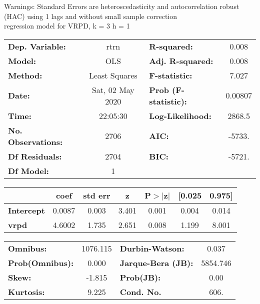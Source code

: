 Warnings: \newline
 [1] Standard Errors are heteroscedasticity and autocorrelation robust (HAC) using 1 lags and without small sample correction\\ 

regression model for VRPD, k = 3 h = 1\begin{center}
\begin{tabular}{lclc}
\toprule
\textbf{Dep. Variable:}    &       rtrn       & \textbf{  R-squared:         } &     0.008   \\
\textbf{Model:}            &       OLS        & \textbf{  Adj. R-squared:    } &     0.008   \\
\textbf{Method:}           &  Least Squares   & \textbf{  F-statistic:       } &     7.027   \\
\textbf{Date:}             & Sat, 02 May 2020 & \textbf{  Prob (F-statistic):} &  0.00807    \\
\textbf{Time:}             &     22:05:30     & \textbf{  Log-Likelihood:    } &    2868.5   \\
\textbf{No. Observations:} &        2706      & \textbf{  AIC:               } &    -5733.   \\
\textbf{Df Residuals:}     &        2704      & \textbf{  BIC:               } &    -5721.   \\
\textbf{Df Model:}         &           1      & \textbf{                     } &             \\
\bottomrule
\end{tabular}
\begin{tabular}{lcccccc}
                   & \textbf{coef} & \textbf{std err} & \textbf{z} & \textbf{P$> |$z$|$} & \textbf{[0.025} & \textbf{0.975]}  \\
\midrule
\textbf{Intercept} &       0.0087  &        0.003     &     3.401  &         0.001        &        0.004    &        0.014     \\
\textbf{vrpd}      &       4.6002  &        1.735     &     2.651  &         0.008        &        1.199    &        8.001     \\
\bottomrule
\end{tabular}
\begin{tabular}{lclc}
\textbf{Omnibus:}       & 1076.115 & \textbf{  Durbin-Watson:     } &    0.037  \\
\textbf{Prob(Omnibus):} &   0.000  & \textbf{  Jarque-Bera (JB):  } & 5854.746  \\
\textbf{Skew:}          &  -1.815  & \textbf{  Prob(JB):          } &     0.00  \\
\textbf{Kurtosis:}      &   9.225  & \textbf{  Cond. No.          } &     606.  \\
\bottomrule
\end{tabular}
\end{center}

